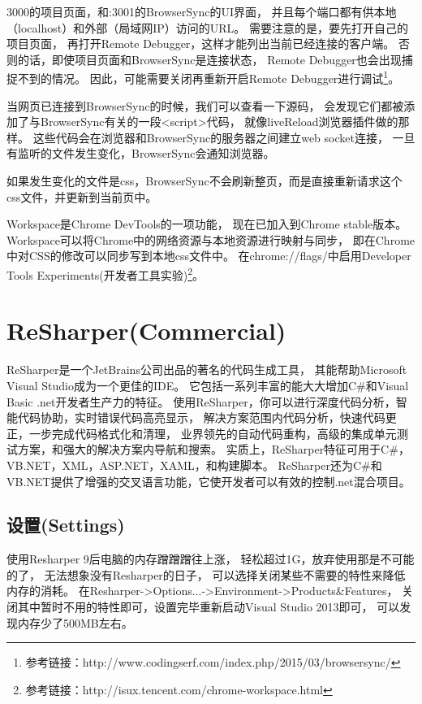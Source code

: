 \documentclass{book}
\begin{document}
3000的项目页面，和:3001的BrowserSync的UI界面，
并且每个端口都有供本地（localhost）和外部（局域网IP）访问的URL。
需要注意的是，要先打开自己的项目页面，
再打开Remote Debugger，这样才能列出当前已经连接的客户端。
否则的话，即使项目页面和BrowserSync是连接状态，
Remote Debugger也会出现捕捉不到的情况。
因此，可能需要关闭再重新开启Remote Debugger进行调试\footnote{参考链接：http://www.codingserf.com/index.php/2015/03/browsersync/}。

当网页已连接到BrowserSync的时候，我们可以查看一下源码，
会发现它们都被添加了与BrowserSync有关的一段<script>代码，
就像liveReload浏览器插件做的那样。
这些代码会在浏览器和BrowserSync的服务器之间建立web socket连接，
一旦有监听的文件发生变化，BrowserSync会通知浏览器。

如果发生变化的文件是css，BrowserSync不会刷新整页，而是直接重新请求这个css文件，并更新到当前页中。

Workspace是Chrome DevTools的一项功能，
现在已加入到Chrome stable版本。
Workspace可以将Chrome中的网络资源与本地资源进行映射与同步，
即在Chrome中对CSS的修改可以同步写到本地css文件中。
在chrome://flags/中启用Developer Tools Experiments(开发者工具实验)\footnote{参考链接：http://isux.tencent.com/chrome-workspace.html}。

\section{ReSharper(Commercial)}

ReSharper是一个JetBrains公司出品的著名的代码生成工具，
其能帮助Microsoft Visual Studio成为一个更佳的IDE。
它包括一系列丰富的能大大增加C\#和Visual Basic .net开发者生产力的特征。
使用ReSharper，你可以进行深度代码分析，智能代码协助，实时错误代码高亮显示，
解决方案范围内代码分析，快速代码更正，一步完成代码格式化和清理，
业界领先的自动代码重构，高级的集成单元测试方案，和强大的解决方案内导航和搜索。
实质上，ReSharper特征可用于C\#，VB.NET，XML，ASP.NET，XAML，和构建脚本。
ReSharper还为C\#和VB.NET提供了增强的交叉语言功能，它使开发者可以有效的控制.net混合项目。

\subsection{设置(Settings)}

使用Resharper 9后电脑的内存蹭蹭蹭往上涨，
轻松超过1G，放弃使用那是不可能的了，
无法想象没有Resharper的日子，
可以选择关闭某些不需要的特性来降低内存的消耗。
在Resharper->Options...->Environment->Products\&Features，
关闭其中暂时不用的特性即可，设置完毕重新启动Visual Studio 2013即可，
可以发现内存少了500MB左右。
\end{document}
